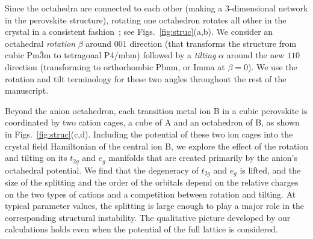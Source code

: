 \documentclass[a4paper,prb,twocolumn]{revtex4-1}  %
\newcommand{\com}[1]{}
\begin{document}

Since the octahedra are connected to each other 
(making a 3-dimensional network in the perovskite structure),
rotating one octahedron rotates all other in the crystal in a consistent fashion~\cite{GlazerAC72};
 see Figs.~\ref{fig:struc}(a,b).
We consider an octahedral \emph{rotation} $\beta$ around $001$ direction
(that transforms the structure from cubic Pm$\bar 3$m to tetragonal P4/mbm)
followed by a \emph{tilting} $\alpha$ around the new $110$ direction
(transforming to orthorhombic Pbnm, 
or Imma 
 at ${\beta=0}$).
We use the rotation and tilt terminology for these 
two angles throughout the rest of the manuscript.


Beyond the anion octahedron,
each transition metal ion B in a cubic perovskite
is coordinated by two cation cages,
a cube of A and an octahedron of B, as shown in Figs.~\ref{fig:struc}(c,d).
Including the 
potential of these two ion cages
into the 
crystal field Hamiltonian of 
the central ion B,
we explore the effect 
of the rotation and tilting on 
its $t_{2g}$ and $e_g$ manifolds
that are
created primarily by the anion's octahedral potential.
We find that the degeneracy of $t_{2g}$ and $e_g$
is lifted, and
the size of the splitting 
and 
the order of the orbitals
depend
on the relative charges on the two types of cations
and a competition between rotation and tilting.
At typical parameter values,
the splitting is large enough 
to play a major role in 
the corresponding structural instability. 
The qualitative picture developed by our calculations 
holds even when the potential of the full lattice is considered.



\com{
$\alpha=0, \beta \neq 0$\\
Tetragonal:
127. P 4 / m b m
$\alpha \neq 0,\beta=0$\\
Orthorhombic:
74. I m m a
$\alpha,\beta \neq 0$\\
Orthorhombic:
62. Pbnm
}
\end{document}
